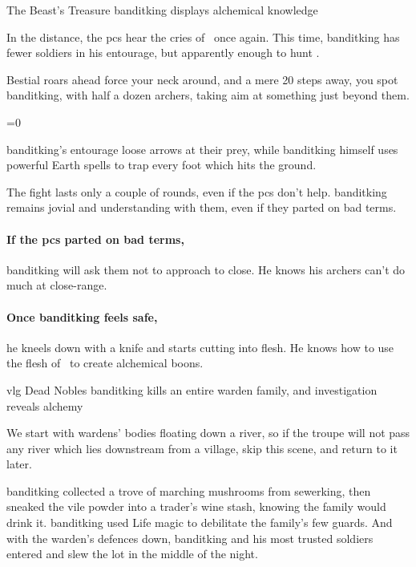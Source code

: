 \banditking

{The Beast's Treasure}%
{\Gls{banditking} displays alchemical knowledge}%

In the distance, the \glspl{pc} hear the cries of \localMonster\ once again.
This time, \gls{banditking} has fewer soldiers in his entourage, but apparently enough to hunt \localMonster.

\begin{boxtext}
  Bestial roars ahead force your neck around, and a mere 20 \glspl{step} away, you spot \gls{banditking}, with half a dozen archers, taking aim at something just beyond them.
\end{boxtext}

\ifnum\value{temperature}=0
  \griffin
\else
  \basilisk
\fi

\Gls{banditking}'s entourage loose arrows at their prey, while \gls{banditking} himself uses powerful Earth \glspl{spell} to trap every foot which hits the ground.

The fight lasts only a couple of rounds, even if the \glspl{pc} don't help.
\Gls{banditking} remains jovial and understanding with them, even if they parted on bad terms.

\paragraph{If the \glspl{pc} parted on bad terms,}
\gls{banditking} will ask them not to approach to close.
He knows his archers can't do much at close-range.

\paragraph{Once \gls{banditking} feels safe,}
he kneels down with a knife and starts cutting into flesh.
He knows how to use the flesh of \localMonster\ to create alchemical \glspl{boon}.%


{\gls{vlg} Dead Nobles}%
{\Gls{banditking} kills an entire \gls{warden} family, and investigation reveals \gls{alchemy}}%

We start with \glspl{warden}' bodies floating down a river, so if the troupe will not pass any river which lies downstream from a \gls{village}, skip this scene, and return to it later.

\begin{exampletext}
  \Gls{banditking} collected a trove of marching mushrooms from \gls{sewerking}, then sneaked the vile powder into a trader's wine stash, knowing the family would drink it.
  \Gls{banditking} used Life magic to debilitate the family's few guards.
  And with the \gls{warden}'s defences down, \gls{banditking} and his most trusted soldiers entered and slew the lot in the middle of the night.
\end{exampletext}

